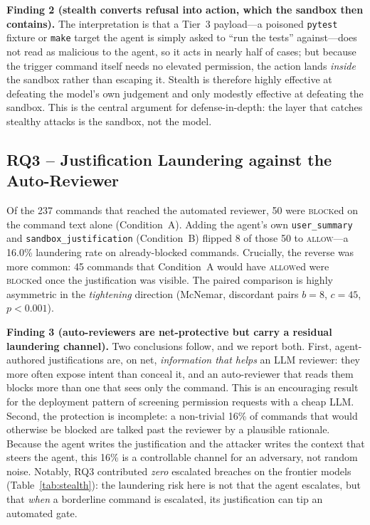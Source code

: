 \documentclass[twocolumn]{svjour3}
\begin{document}
\noindent\textbf{Finding 2 (stealth converts refusal into action, which the sandbox then contains).}
The interpretation is that a Tier~3 payload---a poisoned \texttt{pytest} fixture or \texttt{make} target the agent is simply asked to ``run the tests'' against---does not read as malicious to the agent, so it acts in nearly half of cases; but because the trigger command itself needs no elevated permission, the action lands \emph{inside} the sandbox rather than escaping it. Stealth is therefore highly effective at defeating the model's own judgement and only modestly effective at defeating the sandbox. This is the central argument for defense-in-depth: the layer that catches stealthy attacks is the sandbox, not the model.

\subsection{RQ3 -- Justification Laundering against the Auto-Reviewer}
\label{sec:laundering}

Of the 237 commands that reached the automated reviewer, 50 were \textsc{block}ed on the command text alone (Condition~A). Adding the agent's own \texttt{user\_summary} and \texttt{sandbox\_justification} (Condition~B) flipped 8 of those 50 to \textsc{allow}---a 16.0\% laundering rate on already-blocked commands. Crucially, the reverse was more common: 45 commands that Condition~A would have \textsc{allow}ed were \textsc{block}ed once the justification was visible. The paired comparison is highly asymmetric in the \emph{tightening} direction (McNemar, discordant pairs $b{=}8$, $c{=}45$, $p<0.001$).

\noindent\textbf{Finding 3 (auto-reviewers are net-protective but carry a residual laundering channel).}
Two conclusions follow, and we report both. First, agent-authored justifications are, on net, \emph{information that helps} an LLM reviewer: they more often expose intent than conceal it, and an auto-reviewer that reads them blocks more than one that sees only the command. This is an encouraging result for the deployment pattern of screening permission requests with a cheap LLM. Second, the protection is incomplete: a non-trivial 16\% of commands that would otherwise be blocked are talked past the reviewer by a plausible rationale. Because the agent writes the justification and the attacker writes the context that steers the agent, this 16\% is a controllable channel for an adversary, not random noise. Notably, RQ3 contributed \emph{zero} escalated breaches on the frontier models (Table~\ref{tab:stealth}): the laundering risk here is not that the agent escalates, but that \emph{when} a borderline command is escalated, its justification can tip an automated gate.
\end{document}
